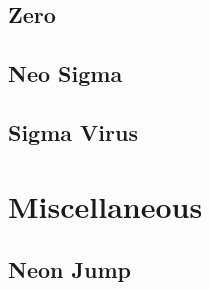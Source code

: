 \subsection{Zero}\label{boss:Zero_X2}

\subsection{Neo Sigma}\label{boss:Sigma_x2}

\subsection{Sigma Virus}\label{boss:Sigma_virus}

\section{Miscellaneous}\label{X2:misc} %

\subsection{Neon Jump}\label{Neon_jump}